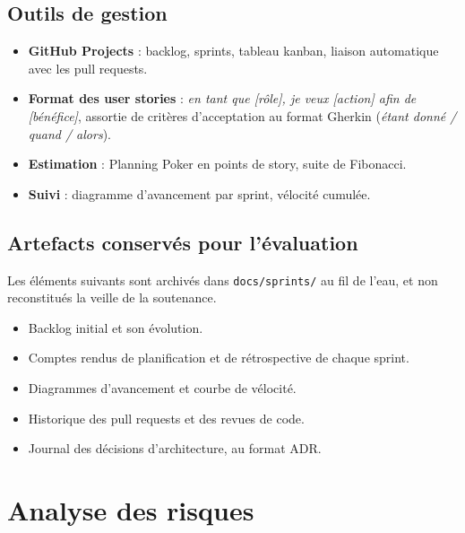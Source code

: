 \documentclass[11pt,a4paper]{article}
\begin{document}
\subsection{Outils de gestion}

\begin{itemize}
  \item \textbf{GitHub Projects} : backlog, sprints, tableau kanban, liaison automatique
        avec les pull requests.
  \item \textbf{Format des user stories} : \textit{en tant que [rôle], je veux [action]
        afin de [bénéfice]}, assortie de critères d'acceptation au format Gherkin
        (\textit{étant donné / quand / alors}).
  \item \textbf{Estimation} : Planning Poker en points de story, suite de Fibonacci.
  \item \textbf{Suivi} : diagramme d'avancement par sprint, vélocité cumulée.
\end{itemize}

\subsection{Artefacts conservés pour l'évaluation}

\begin{decisionbox}
Les éléments suivants sont archivés dans \texttt{docs/sprints/} au fil de l'eau, et non
reconstitués la veille de la soutenance.
\end{decisionbox}

\begin{itemize}
  \item Backlog initial et son évolution.
  \item Comptes rendus de planification et de rétrospective de chaque sprint.
  \item Diagrammes d'avancement et courbe de vélocité.
  \item Historique des pull requests et des revues de code.
  \item Journal des décisions d'architecture, au format ADR.
\end{itemize}

\section{Analyse des risques}
\end{document}
